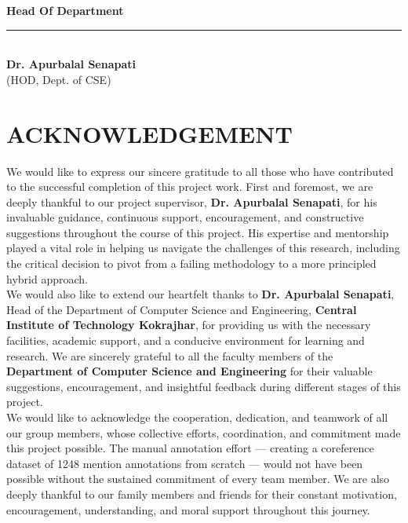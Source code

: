 \documentclass[12pt,a4paper]{report}
\begin{document}
\noindent \textbf{Head Of Department}\\[0.5cm]
\rule{4cm}{0.4pt}\\[0.1cm]
\textbf{Dr. Apurbalal Senapati}\\
(HOD, Dept. of CSE)

\newpage
\chapter*{\fontsize{20}{24}\selectfont ACKNOWLEDGEMENT}

\noindent We would like to express our sincere gratitude to all those who have contributed to the successful completion of this project work. First and foremost, we are deeply thankful to our project supervisor, \textbf{Dr. Apurbalal Senapati}, for his invaluable guidance, continuous support, encouragement, and constructive suggestions throughout the course of this project. His expertise and mentorship played a vital role in helping us navigate the challenges of this research, including the critical decision to pivot from a failing methodology to a more principled hybrid approach.\\[0.5cm]

\noindent We would also like to extend our heartfelt thanks to \textbf{Dr. Apurbalal Senapati}, Head of the Department of Computer Science and Engineering, \textbf{Central Institute of Technology Kokrajhar}, for providing us with the necessary facilities, academic support, and a conducive environment for learning and research. We are sincerely grateful to all the faculty members of the \textbf{Department of Computer Science and Engineering} for their valuable suggestions, encouragement, and insightful feedback during different stages of this project.\\[0.5cm]

\noindent We would like to acknowledge the cooperation, dedication, and teamwork of all our group members, whose collective efforts, coordination, and commitment made this project possible. The manual annotation effort --- creating a coreference dataset of 1248 mention annotations from scratch --- would not have been possible without the sustained commitment of every team member. We are also deeply thankful to our family members and friends for their constant motivation, encouragement, understanding, and moral support throughout this journey.\\[0.5cm]
\end{document}
